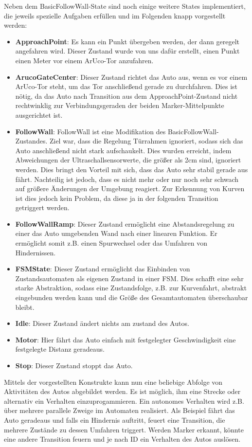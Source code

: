 Neben dem BasicFollowWall-State sind noch einige weitere States implementiert, die jeweils spezielle Aufgaben erfüllen und im Folgenden knapp vorgestellt werden:
\begin{itemize}
	\item \textbf{ApproachPoint}: Es kann ein Punkt übergeben werden, der dann geregelt angefahren wird. Dieser Zustand wurde von uns dafür erstellt, einen Punkt einen Meter vor einem ArUco-Tor anzufahren.
	\item \textbf{ArucoGateCenter}: Dieser Zustand richtet das Auto aus, wenn es vor einem ArUco-Tor steht, um das Tor anschließend gerade zu durchfahren. Dies ist nötig, da das Auto nach Transition aus dem ApproachPoint-Zustand nicht rechtwinklig zur Verbindungsgeraden der beiden Marker-Mittelpunkte ausgerichtet ist.
	\item \textbf{FollowWall}: FollowWall ist eine Modifikation des BasicFollowWall-Zustandes. Ziel war, dass die Regelung Türrahmen ignoriert, sodass sich das Auto anschließend nicht stark aufschaukelt. Dies wurden erreicht, indem Abweichungen der Ultraschallsensorwerte, die größer als 2cm sind, ignoriert werden. Dies bringt den Vorteil mit sich, dass das Auto sehr stabil gerade aus fährt. Nachteilig ist jedoch, dass es nicht mehr oder nur noch sehr schwach auf größere Änderungen der Umgebung reagiert. Zur Erkennung von Kurven ist dies jedoch kein Problem, da diese ja in der folgenden Transition getriggert werden.
	\item \textbf{FollowWallRamp}: Dieser Zustand ermöglicht eine Abstandsregelung zu einer das Auto umgebenden Wand nach einer linearen Funktion. Er ermöglicht somit z.B. einen Spurwechsel oder das Umfahren von Hindernissen.
	\item \textbf{FSMState}: Dieser Zustand ermöglicht das Einbinden von Zustandsautomaten als eigenen Zustand in einer FSM. Dies schafft eine sehr starke Abstraktion, sodass eine Zustandsfolge, z.B. zur Kurvenfahrt, abstrakt eingebunden werden kann und die Größe des Gesamtautomaten überschaubar bleibt.
	\item \textbf{Idle}: Dieser Zustand ändert nichts am zustand des Autos. 
	\item \textbf{Motor}: Hier fährt das Auto einfach mit festgelegter Geschwindigkeit eine festgelegte Distanz geradeaus.
	\item \textbf{Stop}: Dieser Zustand stoppt das Auto.
\end{itemize}
Mittels der vorgestellten Konstrukte kann nun eine beliebige Abfolge von Aktivitäten des Autos abgebildet werden. Es ist möglich, ihm eine Strecke oder alternativ ein Verhalten einzuprogammieren. Ein autonomes Verhalten wird z.B. über mehrere parallele Zweige im Automaten realisiert. Als Beispiel fährt das Auto geradeaus und falls ein Hindernis auftritt, feuert eine Transition, die mehrere Zustände zu dessen Umfahren triggert. Werden Marker erkannt, könnte eine andere Transition feuern und je nach ID ein Verhalten des Autos auslösen.

